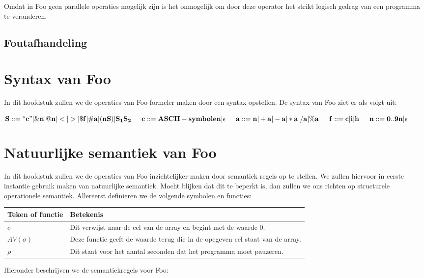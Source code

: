 \documentclass[11pt]{article}
\begin{document}
Omdat in Foo geen parallele operaties mogelijk zijn is het onmogelijk om door deze operator het strikt logisch gedrag van een programma te veranderen.

\subsection{Foutafhandeling}

\section{Syntax van Foo}
In dit hoofdstuk zullen we de operaties van Foo formeler maken door een syntax opstellen. 
De syntax van Foo ziet er als volgt uit:
\newline

\begin{math}
{\bf S::= ``c" | \&n | @n | < | > | \$f | \#a | (nS) | S_{1}S_{2} }
\newline
\newline
\indent{\bf c::= ASCII-symbolen| \epsilon}
\newline
\indent{\bf a::= n | +a | -a | *a | /a | \%a}
\newline 
\indent{\bf f::= c | i | h}
\newline
\indent{\bf n::= 0..9n | \epsilon}
\end{math}





\section{Natuurlijke semantiek van Foo}
In dit hoofdstuk zullen we de operaties van Foo inzichtelijker maken door semantiek regels op te stellen. 
We zullen hiervoor in eerste instantie gebruik maken van natuurlijke semantiek.
Mocht blijken dat dit te beperkt is, dan zullen we ons richten op structurele operationele semantiek.
Allereerst definieren we de volgende symbolen en functies:
\newline
\newline
\begin{tabular}{ | l | p{12cm} |}
    \hline
    Teken of functie & Betekenis \\ \hline
    \begin{math} \sigma \end{math} &  Dit verwijst naar de cel van de array en begint met de waarde 0. \\ \hline
    \begin{math} AV(\sigma) \end{math} & Deze functie geeft de waarde terug die in de opegeven cel staat van de array. \\ \hline
    \begin{math} \rho \end{math} &  Dit staat voor het aantal seconden dat het programma moet pauzeren. \\ \hline

\end{tabular}
\newline
\newline
\newline
Hieronder beschrijven we de semantiekregels voor Foo:
\end{document}
